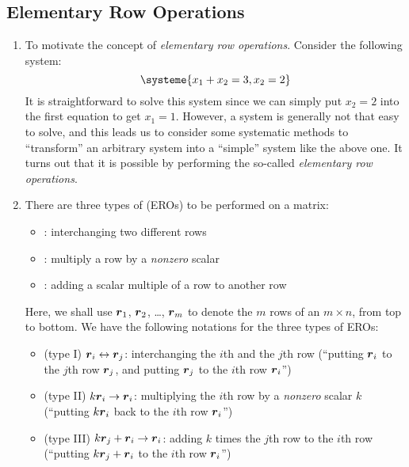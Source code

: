 \subsection{Elementary Row Operations}
\begin{enumerate}
\item \label{it:motivate-ero}
To motivate the concept of \emph{elementary row operations}. Consider the
following system:
\[
\systeme{
x_1+x_2=3,
x_2=2
}
\]
It is straightforward to solve this system since we can simply put \(x_2=2\)
into the first equation to get \(x_1=1\). However, a system is generally not
that easy to solve, and this leads us to consider some systematic methods to
``transform'' an arbitrary system into a ``simple'' system like the above one.
It turns out that it is possible by performing the so-called \emph{elementary
row operations}.

\item There are three types of  (EROs) to be
performed on a matrix:
\begin{itemize}
\item {}: interchanging two different rows
\item {}: multiply a row by a \emph{nonzero} scalar
\item {}: adding a scalar multiple of a row to another row
\end{itemize}
Here, we shall use \(\vb*{r}_1\), \(\vb*{r}_{2}\), \ldots, \(\vb*{r}_{m}\)
to denote the \(m\) rows of an \(m\times n\), from top to bottom. We have the
following notations for the three types of EROs:
\begin{itemize}
\item (type I) \(\vb*{r}_{i}\leftrightarrow \vb*{r}_{j}\): interchanging the
\(i\)th and the \(j\)th row (``putting \(\vb*{r}_{i}\) to the \(j\)th row
\(\vb*{r}_{j}\), and putting \(\vb*{r}_{j}\) to the \(i\)th row
\(\vb*{r}_{i}\)'')
\item (type II) \(k\vb*{r}_{i}\to \vb*{r}_{i}\): multiplying the \(i\)th row
by a \emph{nonzero} scalar \(k\) (``putting \(k\vb*{r}_{i}\) back to the
\(i\)th row \(\vb*{r}_{i}\)'')
\item (type III) \(k\vb*{r}_{j}+\vb*{r}_{i}\to \vb*{r}_{i}\): adding \(k\)
times the \(j\)th row to the \(i\)th row (``putting
\(k\vb*{r}_{j}+\vb*{r}_{i}\) to the \(i\)th row \(\vb*{r}_{i}\)'')
\end{itemize}
\end{enumerate}
